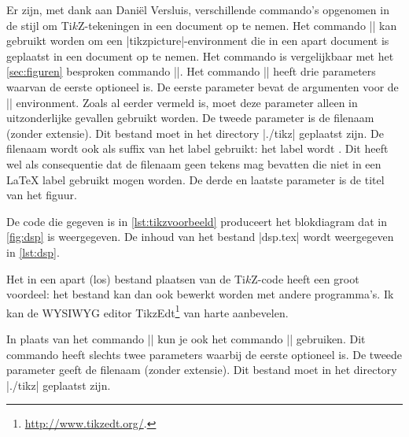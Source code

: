 Er zijn, met dank aan Daniël Versluis, verschillende commando's opgenomen in de stijl om Ti$k$Z-tekeningen in een document op te nemen. 
Het commando |\tikzfiguur| kan gebruikt worden om een |tikzpicture|-environment die in een apart document is geplaatst in een document op te nemen. 
Het commando is vergelijkbaar met het \cref{sec:figuren} besproken commando |\figuur|. 
Het commando |\tikzfiguur| heeft drie parameters waarvan de eerste optioneel is.
De eerste parameter bevat de  argumenten voor de |\figure| environment.
Zoals al eerder vermeld is, moet deze parameter alleen in uitzonderlijke gevallen gebruikt worden.
De tweede parameter is de filenaam (zonder extensie).
Dit bestand moet in het directory |./tikz| geplaatst zijn.
De filenaam wordt ook als suffix van het label gebruikt: het label wordt {\lstllabel{}}.
Dit heeft wel als consequentie dat de filenaam geen tekens mag bevatten die niet in een \LaTeX{} label gebruikt mogen worden.
De derde en laatste parameter is de titel van het figuur.

De code die gegeven is in \cref{lst:tikzvoorbeeld} produceert het blokdiagram dat in \cref{fig:dsp} is weergegeven.
De inhoud van het bestand |dsp.tex| wordt weergegeven in \cref{lst:dsp}.




Het in een apart (los) bestand plaatsen van de Ti$k$Z-code heeft een groot voordeel: het bestand kan dan ook bewerkt worden met andere programma's. Ik kan de WYSIWYG editor TikzEdt\footnote{%
	\url{http://www.tikzedt.org/}.
} van harte aanbevelen. 

In plaats van het commando |\tikzfiguur| kun je ook het commando |\hrtikzfigure|\label{hrtikzfigure} gebruiken. Dit commando heeft slechts twee parameters waarbij de eerste optioneel is. 
De tweede parameter geeft de filenaam (zonder extensie).
Dit bestand moet in het directory |./tikz| geplaatst zijn.

